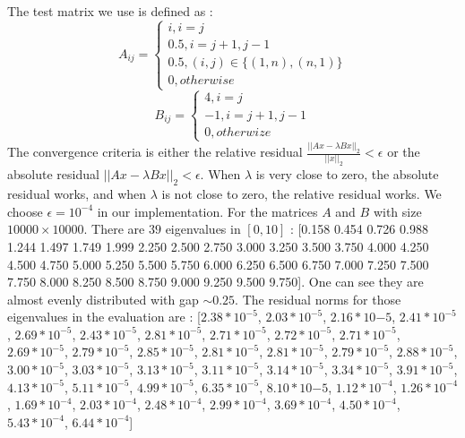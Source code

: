 \label{sec:results}

The test matrix we use is defined as :
\[
A_{ij} =
\begin{cases}
i, i =j \\
0.5, i = j+1, j-1 \\
0.5, (i, j) \in \{(1, n), (n,1)\} \\
0, otherwise
\end{cases}
\]
\[
B_{ij} = 
\begin{cases}
4, i = j \\
-1, i = j+1, j-1 \\
0, otherwize
\end{cases}
\]
The convergence criteria is either the relative residual $\frac{||Ax-\lambda B x||_2}{||x||_2} < \epsilon$ or the absolute residual $||Ax-\lambda B x||_2 < \epsilon$. When $\lambda$ is very close to zero, the absolute residual works, and when $\lambda$ is not close to zero, the relative residual works. We choose $\epsilon = 10^{-4}$ in our implementation. For the matrices $A$ and $B$ with size $10000 \times 10000$. There are $39$ eigenvalues in $[0, 10]$ : [0.158 0.454 0.726 0.988 1.244 1.497 1.749 1.999 2.250 2.500 2.750 3.000 3.250 3.500 3.750 4.000 4.250 4.500 4.750 5.000 5.250 5.500 5.750 6.000 6.250 6.500 6.750 7.000 7.250 7.500 7.750 8.000 8.250 8.500 8.750 9.000 9.250 9.500 9.750]. One can see they are almost evenly distributed with gap $\sim 0.25$. The residual norms for those eigenvalues in the evaluation are : [$2.38*10^{-5}$, $2.03*10^{-5}$, $2.16*10{-5}$, $2.41*10^{-5}$, $2.69*10^{-5}$, $2.43*10^{-5}$, $2.81*10^{-5}$, 
$2.71*10^{-5}$, $2.72*10^{-5}$, $2.71*10^{-5}$, $2.69*10^{-5}$, $2.79*10^{-5}$, $2.85*10^{-5}$, $2.81*10^{-5}$, 
$2.81*10^{-5}$, $2.79*10^{-5}$, $2.88*10^{-5}$, $3.00*10^{-5}$, $3.03*10^{-5}$, $3.13*10^{-5}$, $3.11*10^{-5}$, 
$3.14*10^{-5}$, $3.34*10^{-5}$, $3.91*10^{-5}$, $4.13*10^{-5}$, $5.11*10^{-5}$, $4.99*10^{-5}$, $6.35*10^{-5}$, 
$8.10*10{-5}$, $1.12*10^{-4}$, $1.26*10^{-4}$, $1.69*10^{-4}$, $2.03*10^{-4}$, $2.48*10^{-4}$, $2.99*10^{-4}$, 
$3.69*10^{-4}$, $4.50*10^{-4}$, $5.43*10^{-4}$, $6.44*10^{-4}$]


